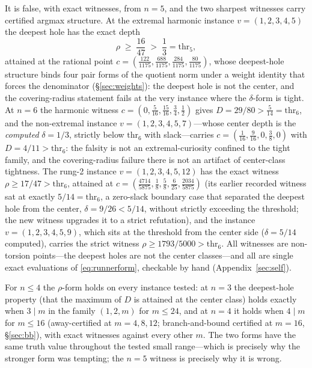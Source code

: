 It is false, with exact witnesses, from $n=5$, and the two sharpest
witnesses carry certified argmax structure. At the extremal harmonic
instance $v=(1,2,3,4,5)$ the deepest hole has the exact depth
\[
\rho\;\ge\;\frac{16}{47}\;>\;\frac13=\mathrm{thr}_5,
\]
attained at the rational point
$c=(\tfrac{122}{1175},\tfrac{688}{1175},\tfrac{284}{1175},
\tfrac{80}{1175})$, whose deepest-hole structure binds four pair forms
of the quotient norm under a weight identity that forces the denominator
(\S\ref{sec:weights}): the deepest hole is not the center, and the
covering-radius statement fails at the very instance where the
$\delta$-form is tight. At $n=6$ the harmonic witness
$c=(0,\tfrac5{16},\tfrac{15}{16},\tfrac34,\tfrac12)$ gives
$D=29/80>\tfrac5{14}=\mathrm{thr}_6$, and the non-extremal instance
$v=(1,2,3,4,5,7)$---whose center depth is the \emph{computed}
$\delta=1/3$, strictly below $\mathrm{thr}_6$ with slack---carries
$c=(\tfrac1{16},\tfrac9{16},0,\tfrac38,0)$
with $D=4/11>\mathrm{thr}_6$: the falsity is not an extremal-curiosity
confined to the tight family, and the covering-radius failure there is
not an artifact of center-class tightness. The rung-2 instance
$v=(1,2,3,4,5,12)$ has the exact witness $\rho\ge17/47>\mathrm{thr}_6$,
attained at
$c=(\tfrac{4714}{5875},\tfrac18,\tfrac58,\tfrac6{25},
\tfrac{2034}{5875})$ (its earlier recorded witness sat at exactly
$5/14=\mathrm{thr}_6$, a zero-slack boundary case that separated the
deepest hole from the center, $\delta=9/26<5/14$, without strictly
exceeding the threshold; the new witness upgrades it to a strict
refutation), and the instance $v=(1,2,3,4,5,9)$, which sits at the
threshold from the center side ($\delta=5/14$ computed), carries the
strict witness $\rho\ge 1793/5000>\mathrm{thr}_6$. All witnesses are
non-torsion points---the deepest holes are
not the center classes---and all are single exact evaluations of
\eqref{eq:runnerform}, checkable by hand (Appendix~\ref{sec:self}).

For $n\le4$ the $\rho$-form holds on every instance tested: at $n=3$
the deepest-hole property (that the maximum of $D$ is attained at the
center class) holds exactly when $3\mid m$ in the family
$(1,2,m)$ for $m\le24$, and at $n=4$ it holds when $4\mid m$ for
$m\le16$ (away-certified at $m=4,8,12$; branch-and-bound certified at
$m=16$, \S\ref{sec:bb}), with exact witnesses against every other $m$.
The two forms have the same truth value throughout the tested small
range---which is precisely why the stronger form was tempting; the
$n=5$ witness is precisely why it is wrong.

